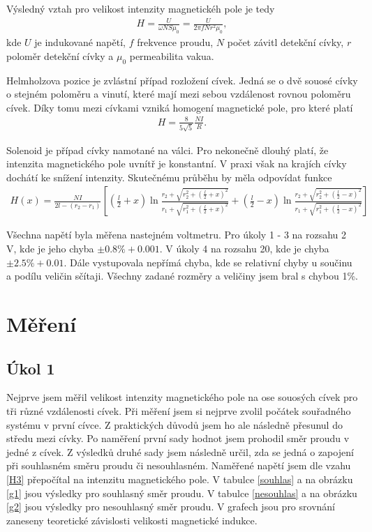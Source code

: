 \documentclass[a4paper,12pt]{article}
\begin{document}
Výsledný vztah pro velikost intenzity magnetickéh pole je tedy
\begin{eqnarray}
H=\frac{U}{\omega NS\mu_0}=\frac{U}{2\pi fNr^2\mu_0},
\label{H3}
\end{eqnarray}
kde $U$ je indukované napětí, $f$ frekvence proudu, $N$ počet závitl detekční cívky, $r$ poloměr detekční cívky a $\mu_0$ permeabilita vakua.

Helmholzova pozice je zvlástní případ rozložení cívek. Jedná se o dvě souosé cívky o stejném poloměru a vinutí, které 
mají mezi sebou vzdálenost rovnou poloměru cívek. Díky tomu mezi cívkami vzniká homogení magnetické pole, pro které platí
\begin{eqnarray}
H=\frac{8}{5\sqrt5}\frac{NI}{R}.
\label{H4}
\end{eqnarray}

Solenoid je případ cívky namotané na válci. Pro nekonečně dlouhý platí, že intenzita magnetického pole uvnítř je konstantní. 
V praxi však na krajích cívky dochátí ke snížení intenzity. Skutečnému průběhu by měla odpovídat funkce
\begin{eqnarray}
H(x)=\frac{NI}{2l-(r_2-r_1)}\left[\left(\frac{l}{2}+x\right)\ln\frac{r_2+\sqrt{r_2^2+(\frac{l}{2}+x)^2}}{r_1+\sqrt{r_1^2+(\frac{l}{2}+x)^2}}+\left(\frac{l}{2}-x\right)\ln\frac{r_2+\sqrt{r_2^2+(\frac{l}{2}-x)^2}}{r_1+\sqrt{r_1^2+(\frac{l}{2}-x)^2}}\right]
\label{TSol}
\end{eqnarray}

Všechna napětí byla měřena nastejném voltmetru. Pro úkoly 1 - 3 na rozsahu 2 V, kde je jeho chyba $\pm 0.8\% + 0.001$. V úkoly 4 
na rozsahu 20, kde je chyba $\pm 2.5\% + 0.01$. Dále vystupovala nepřímá chyba, kde se relativní chyby u součinu a podílu veličin sčítaji. 
Všechny zadané rozměry a veličiny jsem bral s chybou 1\%.

\section{Měření}

\subsection{Úkol 1}
Nejprve jsem měřil velikost intenzity magnetického pole na ose souosých cívek pro tři různé vzdálenosti cívek. Při měření jsem si nejprve zvolil 
počátek souřadného systému v první cívce. Z praktických důvodů jsem ho ale následně přesunul do středu mezi cívky. Po naměření první sady hodnot 
jsem prohodil směr proudu v jedné z cívek. Z výsledků druhé sady jsem následně určil, zda se jedná o zapojení při souhlasném směru proudu či nesouhlasném.
Naměřené napětí jsem dle vzahu \ref{H3} přepočítal na intenzitu magnetického pole. V tabulce \ref{souhlas} a na obrázku \ref{g1} jsou výsledky pro 
souhlasný směr proudu. V tabulce \ref{nesouhlas} a na obrázku \ref{g2} jsou výsledky pro nesouhlasný směr proudu. V grafech jsou pro srovnání zaneseny 
teoretické závislosti velikosti magnetické indukce.
\end{document}
